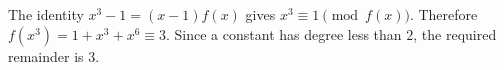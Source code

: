 The identity $x^3-1=(x-1)f(x)$ gives $x^3\equiv1\pmod{f(x)}$. Therefore $f(x^3)=1+x^3+x^6\equiv3$. Since a constant has degree less than $2$, the required remainder is $\boxed3$.
